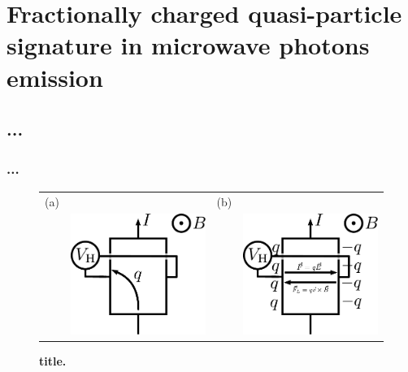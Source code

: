 \chapter{Fractionally charged quasi-particle signature in microwave photons emission}




\section{\texorpdfstring{...}{...}}

\subsection{\texorpdfstring{...}{...}}


\begin{figure}[hptb]
	\begin{center}
		\begin{tabular}{c c c c}
			(a) & & (b) & \\
			& \includegraphics[width = 4 cm]{./chap2/effet_Hall_classique}
			& &
			\includegraphics[width = 4 cm]{./chap2/effet_Hall_classique_bis} \\
		\end{tabular}
	\end{center}
	
	\caption{\textbf{title.}}
	\label{fig: effet Hall classique}
\end{figure}

